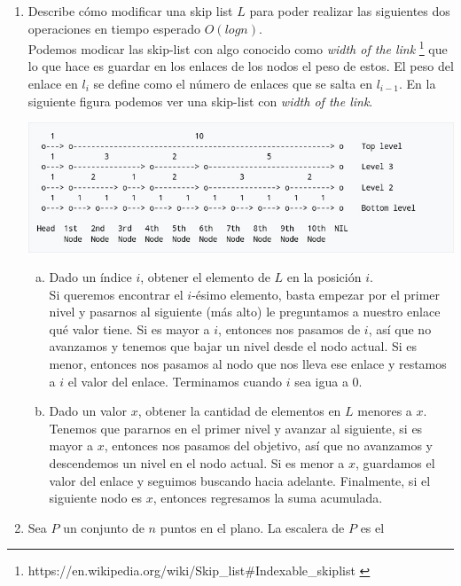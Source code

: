 \documentclass[spanish,12pt,letterpaper]{article}
\begin{document}
\begin{enumerate}
\item Describe cómo modificar una skip list $L$ para poder realizar las
  siguientes dos operaciones en tiempo esperado $O(logn)$.\\
  Podemos modicar las skip-list con algo conocido como \textit{width of the link}
  \footnote{https://en.wikipedia.org/wiki/Skip\_list#Indexable\_skiplist
  \label{skiplist}}
  que lo que hace es guardar en los enlaces de los nodos el peso de estos. El
  peso del enlace en $l_i$ se define como el número de enlaces que se salta en
  $l_{i-1}$. En la siguiente figura podemos ver una skip-list
  con \textit{width of the link}.
  \begin{center}
    \includegraphics[scale=.5]{../imagenes/skiplist.jpg}
  \end{center}
  \begin{enumerate}[a)]
  \item Dado un índice $i$, obtener el elemento de $L$ en la posición $i$.\\
    Si queremos encontrar el $i$-ésimo elemento, basta empezar por el primer
    nivel y pasarnos al siguiente (más alto) le preguntamos a nuestro enlace qué
    valor tiene. Si es mayor a $i$, entonces nos pasamos de $i$, así que no
    avanzamos y tenemos que bajar un nivel desde el nodo actual. Si es menor,
    entonces nos pasamos al nodo que nos lleva ese enlace y restamos a $i$ el
    valor del enlace. Terminamos cuando $i$ sea igua a $0$.
  \item Dado un valor $x$, obtener la cantidad de elementos en $L$ menores a $x$.
    \\
    Tenemos que pararnos en el primer nivel y avanzar al siguiente, si es mayor a
    $x$, entonces nos pasamos del objetivo, así que no avanzamos  y descendemos
    un nivel en el nodo actual. Si es menor a $x$, guardamos el valor del enlace
    y seguimos buscando hacia adelante. Finalmente, si el siguiente nodo es $x$,
    entonces regresamos la suma acumulada.
  \end{enumerate}
\item Sea $P$ un conjunto de $n$ puntos en el plano. La escalera de $P$ es el

\end{enumerate}
\end{document}
